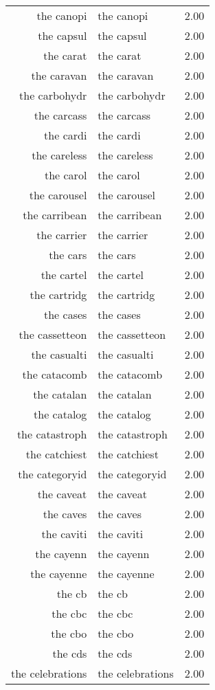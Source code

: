 \begin{table}[ht]
\begin{tabular}{rlr}
  the canopi & the canopi & 2.00 \\ 
  the capsul & the capsul & 2.00 \\ 
  the carat & the carat & 2.00 \\ 
  the caravan & the caravan & 2.00 \\ 
  the carbohydr & the carbohydr & 2.00 \\ 
  the carcass & the carcass & 2.00 \\ 
  the cardi & the cardi & 2.00 \\ 
  the careless & the careless & 2.00 \\ 
  the carol & the carol & 2.00 \\ 
  the carousel & the carousel & 2.00 \\ 
  the carribean & the carribean & 2.00 \\ 
  the carrier & the carrier & 2.00 \\ 
  the cars & the cars & 2.00 \\ 
  the cartel & the cartel & 2.00 \\ 
  the cartridg & the cartridg & 2.00 \\ 
  the cases & the cases & 2.00 \\ 
  the cassetteon & the cassetteon & 2.00 \\ 
  the casualti & the casualti & 2.00 \\ 
  the catacomb & the catacomb & 2.00 \\ 
  the catalan & the catalan & 2.00 \\ 
  the catalog & the catalog & 2.00 \\ 
  the catastroph & the catastroph & 2.00 \\ 
  the catchiest & the catchiest & 2.00 \\ 
  the categoryid & the categoryid & 2.00 \\ 
  the caveat & the caveat & 2.00 \\ 
  the caves & the caves & 2.00 \\ 
  the caviti & the caviti & 2.00 \\ 
  the cayenn & the cayenn & 2.00 \\ 
  the cayenne & the cayenne & 2.00 \\ 
  the cb & the cb & 2.00 \\ 
  the cbc & the cbc & 2.00 \\ 
  the cbo & the cbo & 2.00 \\ 
  the cds & the cds & 2.00 \\ 
  the celebrations & the celebrations & 2.00 \\ 

\end{tabular}
\end{table}
